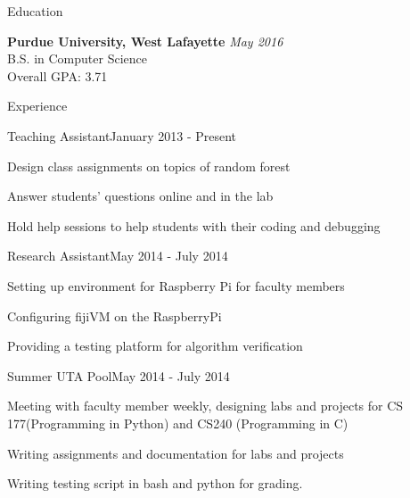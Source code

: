 \documentclass{resume} %
\begin{document}

\begin{rSection}{Education}

{\bf Purdue University, West Lafayette} \hfill {\em May 2016} \\ 
B.S. in Computer Science \\
Overall GPA: 3.71

\end{rSection}


\begin{rSection}{Experience}

\begin{rSubsection}{Teaching Assistant}{January 2013 - Present}{}{}
\item Design class assignments on topics of random forest
\item Answer students' questions online and in the lab
\item Hold help sessions to help students with their coding and debugging
\end{rSubsection}


\begin{rSubsection}{Research Assistant}{May 2014 - July 2014}{}{}
\item Setting up environment for Raspberry Pi for faculty members
\item Configuring fijiVM on the RaspberryPi
\item Providing a testing platform for algorithm verification 
\end{rSubsection}


\begin{rSubsection}{Summer UTA Pool}{May 2014 - July 2014}{}{}
\item Meeting with faculty member weekly, designing labs and projects for CS 177(Programming in Python) and CS240 (Programming in C)
\item Writing assignments and documentation for labs and projects
\item Writing testing script in bash and python for grading.
\end{rSubsection}

\end{rSection}
\end{document}
